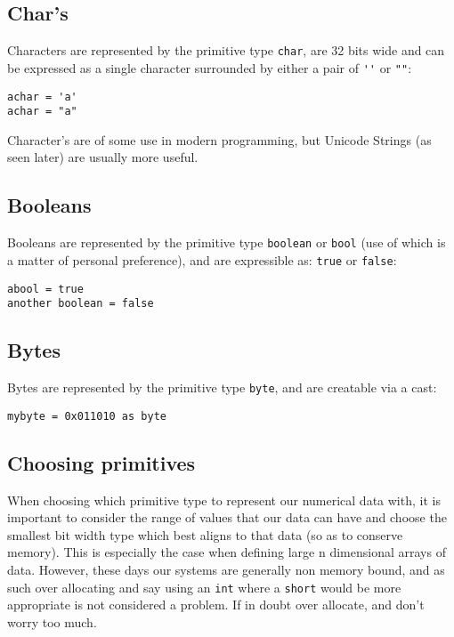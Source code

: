 \documentclass[conc-doc]{subfiles}
\begin{document}
\subsection{Char's}

Characters are represented by the primitive type \lstinline{char}, are 32 bits wide and can be expressed as a single character surrounded by either a pair of \lstinline{''} or \lstinline{""}:

\begin{lstlisting}
achar = 'a'
achar = "a"
\end{lstlisting}

Character's are of some use in modern programming, but Unicode Strings (as seen later) are usually more useful.

\subsection{Booleans}

Booleans are represented by the primitive type \lstinline{boolean} or \lstinline{bool} (use of which is a matter of personal preference), and are expressible as: \lstinline{true} or \lstinline{false}:
\begin{lstlisting}
abool = true
another boolean = false
\end{lstlisting}

\subsection{Bytes}
Bytes are represented by the primitive type \lstinline{byte}, and are creatable via a cast:
\begin{lstlisting}
mybyte = 0x011010 as byte
\end{lstlisting}

\subsection{Choosing primitives}
When choosing which primitive type to represent our numerical data with, it is important to consider the range of values that our data can have and choose the smallest bit width type which best aligns to that data (so as to conserve memory). This is especially the case when defining large n dimensional arrays of data. However, these days our systems are generally non memory bound, and as such over allocating and say using an \lstinline{int} where a \lstinline{short} would be more appropriate is not considered a problem. If in doubt over allocate, and don't worry too much.
\end{document}
